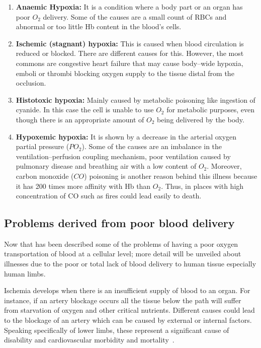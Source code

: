 \begin{enumerate}
    \item \textbf{Anaemic Hypoxia:} It is a condition where a body part or an organ has poor $O_2$ delivery. Some of the causes are a small count of RBCs and abnormal or too little Hb content in the blood's cells.
    \item \textbf{Ischemic (stagnant) hypoxia: }This is caused when blood circulation is reduced or blocked. There are different causes for this. However, the most commons are congestive heart failure that may cause body–wide hypoxia, emboli or thrombi blocking oxygen supply to the tissue distal from the occlusion. 
    \item \textbf{Histotoxic hypoxia: }Mainly caused by metabolic poisoning like ingestion of cyanide. In this case the cell is unable to use $O_2$ for metabolic purposes, even though there is an appropriate amount of $O_2$ being delivered by the body.
    \item \textbf{Hypoxemic hypoxia:} It is shown by a decrease in the arterial oxygen partial pressure ($PO_2$). Some of the causes are an imbalance in the ventilation–perfusion coupling mechanism, poor ventilation caused by pulmonary disease and breathing air with a low content of $O_2$. Moreover, carbon monoxide ($CO$) poisoning is another reason behind this illness because it has \num{200} times more affinity with Hb than $O_2$. Thus, in places with high concentration of CO such as fires could lead easily to death.
\end{enumerate}




\subsection{Problems derived from poor blood delivery} %
\label{section literature 3}
Now that has been described some of the problems of having a poor oxygen transportation of blood at a cellular level; more detail will be unveiled about illnesses due to the poor or total lack of blood delivery to human tissue especially human limbs. 

Ischemia develops when there is an insufficient supply of blood to an organ. For instance, if an artery blockage occurs all the tissue below the path will suffer from starvation of oxygen and other critical nutrients. Different causes could lead to the blockage of an artery which can be caused by external or internal factors. Speaking specifically of lower limbs, these represent a significant cause of disability and cardiovascular morbidity and mortality~\cite{novo1995patients}. 

